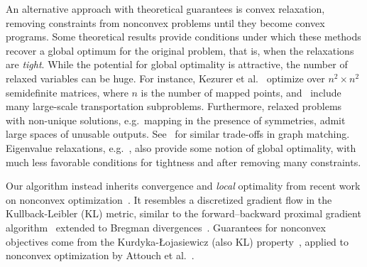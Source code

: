 An alternative approach with theoretical guarantees is convex relaxation, removing constraints from nonconvex problems until they become convex programs.  %
Some theoretical results provide conditions under which these methods recover a global optimum for the original problem, that is, when the relaxations are \emph{tight}.  While the potential for global optimality is attractive, the number of relaxed variables can be huge.  For instance, Kezurer et al.~ optimize over $n^2\times n^2$ semidefinite matrices, where $n$ is the number of mapped points, and~\cite{solomon-2012,solomon-2013} include many large-scale transportation subproblems.  Furthermore, relaxed problems with non-unique solutions, e.g.\ mapping in the presence of symmetries, admit large spaces of unusable outputs.  See~\cite{aflalo-2014,aflalo-2015,lyzinski-2015} for similar trade-offs in graph matching.  Eigenvalue relaxations, e.g.~\cite{leordeanu-2005}, also provide some notion of global optimality, with much less favorable conditions for tightness and after removing many constraints.

Our algorithm instead inherits convergence and \emph{local} optimality from recent work on nonconvex optimization~\cite{bot-2015}.  It resembles a discretized gradient flow in the Kullback-Leibler (KL) metric, similar to the forward--backward proximal gradient algorithm~\cite{bauschke-2011,combettes-2011} extended to Bregman divergences~\cite{bauschke-2006}.  Guarantees for nonconvex objectives come from the Kurdyka-{\L}ojasiewicz (also KL) property~\cite{kurdyka-1998,lojasiewicz-1963,lojasiewicz-1993}, applied to nonconvex optimization by Attouch et al.~.



